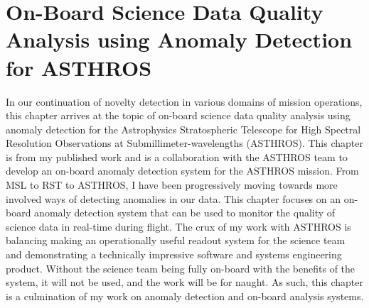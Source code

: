 \chapter[On-Board Science Data Quality Analysis using Anomaly Detection for ASTHROS]{On-Board Science Data Quality Analysis using Anomaly Detection for ASTHROS}
\label{ch:spectra}
In our continuation of novelty detection in various domains of mission operations, this chapter arrives at the topic of on-board science data quality analysis using anomaly detection for the Astrophysics Stratospheric Telescope for High Spectral Resolution Observations at Submillimeter-wavelengths (ASTHROS).
This chapter is from my published work \cite{horton2024board} and is a collaboration with the ASTHROS team to develop an on-board anomaly detection system for the ASTHROS mission.
From MSL to RST to ASTHROS, I have been progressively moving towards more involved ways of detecting anomalies in our data.
This chapter focuses on an on-board anomaly detection system that can be used to monitor the quality of science data in real-time during flight.
The crux of my work with ASTHROS is balancing making an operationally useful readout system for the science team and demonstrating a technically impressive software and systems engineering product. 
Without the science team being fully on-board with the benefits of the system, it will not be used, and the work will be for naught.
As such, this chapter is a culmination of my work on anomaly detection and on-board analysis systems.

